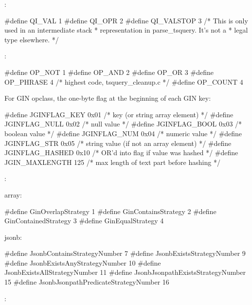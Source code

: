 :

\begin{ccode}
#define QI_VAL 1
#define QI_OPR 2
#define QI_VALSTOP 3            /* This is only used in an intermediate stack
                                 * representation in parse_tsquery. It's not a
                                 * legal type elsewhere. */
\end{ccode}

:

\begin{ccode}
#define OP_NOT          1
#define OP_AND          2
#define OP_OR           3
#define OP_PHRASE       4       /* highest code, tsquery_cleanup.c */
#define OP_COUNT        4
\end{ccode}

For  GIN opclass, the one-byte flag at the beginning of
each GIN key:

\begin{ccode}
#define JGINFLAG_KEY    0x01    /* key (or string array element) */
#define JGINFLAG_NULL   0x02    /* null value */
#define JGINFLAG_BOOL   0x03    /* boolean value */
#define JGINFLAG_NUM    0x04    /* numeric value */
#define JGINFLAG_STR    0x05    /* string value (if not an array element) */
#define JGINFLAG_HASHED 0x10    /* OR'd into flag if value was hashed */
#define JGIN_MAXLENGTH  125     /* max length of text part before hashing */
\end{ccode}

:

\begin{oparts}
\item array:
  \begin{ccode}
#define GinOverlapStrategy      1
#define GinContainsStrategy     2
#define GinContainedStrategy    3
#define GinEqualStrategy        4
  \end{ccode}
\item jsonb:
  \begin{ccode}
#define JsonbContainsStrategyNumber   7
#define JsonbExistsStrategyNumber   9
#define JsonbExistsAnyStrategyNumber  10
#define JsonbExistsAllStrategyNumber  11
#define JsonbJsonpathExistsStrategyNumber   15
#define JsonbJsonpathPredicateStrategyNumber  16
  \end{ccode}
\end{oparts}

:

